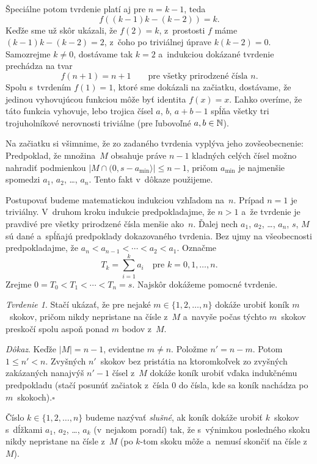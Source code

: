 {Špeciálne potom tvrdenie platí aj pre $n=k-1$, teda
$$
f((k-1)k-(k-2))=k.
$$
Keďže sme už skôr ukázali, že $f(2)=k$, z~prostosti $f$ máme $(k-1)k-(k-2)=2$, z~čoho po triviálnej úprave $k(k-2)=0$. Samozrejme $k\ne0$, dostávame tak $k=2$ a~indukciou dokázané tvrdenie prechádza na tvar
$$
f(n+1)=n+1\qquad\text{pre všetky prirodzené čísla $n$}.
$$
Spolu s~tvrdením $f(1)=1$, ktoré sme dokázali na začiatku, dostávame, že jedinou vyhovujúcou funkciou môže byť identita $f(x)=x$. Ľahko overíme, že táto funkcia vyhovuje, lebo trojica čísel $a$, $b$, $a+b-1$ spĺňa všetky tri trojuholníkové nerovnosti triviálne (pre ľubovoľné $a,b\in\Bbb N$).
}

{%
Na začiatku si všimnime, že zo zadaného tvrdenia vyplýva jeho zovšeobecnenie: Predpoklad, že množina~$M$ obsahuje práve $n-1$ kladných celých čísel možno nahradiť podmienkou $|M\cap(0,s-a_{\min}\rangle|\le n-1$, pričom $a_{\min}$ je najmenšie spomedzi $a_1$, $a_2$, \dots, $a_n$. Tento fakt v~dôkaze použijeme.

Postupovať budeme matematickou indukciou vzhľadom na~$n$. Prípad $n=1$ je triviálny. V~druhom kroku indukcie predpokladajme, že $n>1$ a~že tvrdenie je pravdivé pre všetky prirodzené čísla menšie ako~$n$. Ďalej nech $a_1$, $a_2$, \dots, $a_n$, $s$, $M$ sú dané a~spĺňajú predpoklady dokazovaného tvrdenia. Bez ujmy na všeobecnosti predpokladajme, že $a_n<a_{n-1}<\cdots<a_2<a_1$. Označme
$$
T_k=\sum_{i=1}^k a_i\quad\text{pre $k=0,1,\dots,n$}.
$$
Zrejme $0=T_0<T_1<\cdots<T_n=s$. Najskôr dokážeme pomocné tvrdenie.

\smallskip\noindent
{\it Tvrdenie 1}.
Stačí ukázať, že pre nejaké $m\in\{1,2,\dots,n\}$ dokáže urobiť koník $m$~skokov, pričom nikdy nepristane na čísle z~$M$ a~navyše počas týchto $m$~skokov preskočí spolu aspoň ponad $m$ bodov z~$M$.

\smallskip\noindent
{\it Dôkaz}.
Keďže $|M|=n-1$, evidentne $m\ne n$. Položme $n'=n-m$. Potom $1\le n'<n$. Zvyšných $n'$~skokov bez pristátia na ktoromkoľvek zo zvyšných zakázaných nanajvýš $n'-1$ čísel z~$M$ dokáže koník urobiť vďaka indukčnému predpokladu (stačí posunúť začiatok z~čísla $0$ do čísla, kde sa koník nachádza po $m$~skokoch).\hfill$\square$

\smallskip
Číslo $k\in\{1,2,\dots,n\}$ budeme nazývať {\it slušné}, ak koník dokáže urobiť $k$~skokov s~dĺžkami $a_1$, $a_2$, \dots, $a_k$ (v~nejakom poradí) tak, že s~výnimkou posledného skoku nikdy nepristane na čísle z~$M$ (po $k$-tom skoku môže a~nemusí skončiť na čísle z~$M$).

}
